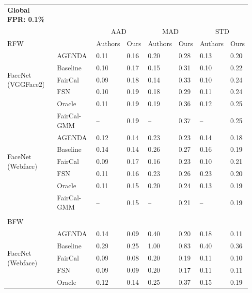 \begin{table}
\begin{tabular}{l l ll ll ll}
\toprule
\textbf{Global FPR: 0.1\%}\\
&& \multicolumn{2}{c}{AAD} & \multicolumn{2}{c}{MAD} & \multicolumn{2}{c}{STD} \\
RFW && Authors & Ours & Authors & Ours & Authors & Ours \\
\midrule
\multirow{5}{5em}{FaceNet (VGGFace2)} 
& AGENDA      &    0.11 &  0.16  &    0.20 &  0.28  &    0.13 &  0.20  \\
& Baseline    &    0.10 &  0.17  &    0.15 &  0.31  &    0.10 &  0.22  \\
& FairCal     &    0.09 &  0.18  &    0.14 &  0.33  &    0.10 &  0.24  \\
& FSN         &    0.10 &  0.19  &    0.18 &  0.29  &    0.11 &  0.24  \\
& Oracle      &    0.11 &  0.19  &    0.19 &  0.36  &    0.12 &  0.25  \\
& FairCal-GMM &     -- &  0.19  &     -- &  0.37  &     -- &  0.25  \\
\hline
\multirow{5}{5em}{FaceNet (Webface)} 
& AGENDA      &    0.12 &  0.14  &    0.23 &  0.23  &    0.14 &  0.18  \\
& Baseline    &    0.14 &  0.14  &    0.26 &  0.27  &    0.16 &  0.19  \\
& FairCal     &    0.09 &  0.17  &    0.16 &  0.23  &    0.10 &  0.21  \\
& FSN         &    0.11 &  0.16  &    0.23 &  0.26  &    0.23 &  0.20  \\
& Oracle      &    0.11 &  0.15  &    0.20 &  0.24  &    0.13 &  0.19  \\
& FairCal-GMM &     -- &  0.15  &     -- &  0.21  &     -- &  0.19  \\
\midrule
\\
BFW & & & & & & &  \\
\midrule
\multirow{5}{5em}{FaceNet (Webface)} 
& AGENDA      &    0.14 &  0.09  &    0.40 &  0.20  &    0.18 &  0.11  \\
& Baseline    &    0.29 &  0.25  &    1.00 &  0.83  &    0.40 &  0.36  \\
& FairCal     &    0.09 &  0.08  &    0.20 &  0.19  &    0.11 &  0.10  \\
& FSN         &    0.09 &  0.09  &    0.20 &  0.17  &    0.11 &  0.11  \\
& Oracle      &    0.12 &  0.14  &    0.25 &  0.37  &    0.15 &  0.19  \\

\end{tabular}
\end{table}
